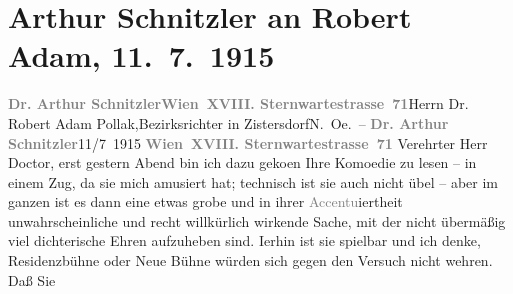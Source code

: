 

         
         \renewcommand{\erwaehntePersonen}{Personen: Robert Adam}
         \renewcommand{\erwaehnteOrte}{Orte: Kammerspiele Wien, Neue Wiener Bühne, Niederösterreich, Sternwartestraße, Wien, Zistersdorf}
         \renewcommand{\erwaehnteWerke}{Werke: Gesellschaft [Eine Gaunerkomödie]}
               \section[Arthur Schnitzler an Robert Adam, 11. 7. 1915]{ Arthur Schnitzler an Robert Adam, 11. 7. 1915}\nopagebreak{}\rehead{ }\begin{ledgroupsized}[t]{13cm}\normalsize\beginnumbering \toendnotes[C]{\smallbreak\pagebreak[2]} 
\toendnotes[C]{\smallbreak}\pstart{}{\pb}\textcolor{gray}{\textbf{Dr. Arthur Schnitzler}}\pend{}\pstart{}\textcolor{gray}{\textbf{Wien XVIII. Sternwartestrasse 71}}\pend{}{\bigskip}\pstart{}{\pb}Herrn Dr. Robert Adam Pollak,\pend{}\pstart{}Bezirksrichter in Zistersdorf\pend{}\pstart{}N. Oe. – \pend{}{\bigskip}\pstart
           \noindent{}{\pb}\textcolor{gray}{\textbf{Dr. Arthur Schnitzler}}\hfill 11/7 1915\pend
           \pstart
           \textcolor{gray}{\textbf{Wien XVIII. Sternwartestrasse 71}}\pend
           \pstart
           Verehrter Herr Doctor, erst gestern Abend bin ich dazu geko{\geminationm}en Ihre Komoedie zu lesen – in einem Zug, da sie mich amusiert hat;
               technisch ist sie auch nicht übel – aber im ganzen ist es dann eine etwas grobe und
               in ihrer \textcolor{gray}{Accentu}iertheit unwahrscheinliche und recht willkürlich
               wirkende Sache, mit der nicht übermäßig \introOben{}viel\introOben{} dichterische
               Ehren aufzuheben sind. I{\geminationm}erhin ist sie spielbar und ich
               denke, Residenzbühne oder Neue Bühne würden sich gegen den Versuch nicht wehren. Daß Sie

\end{ledgroupsized}

